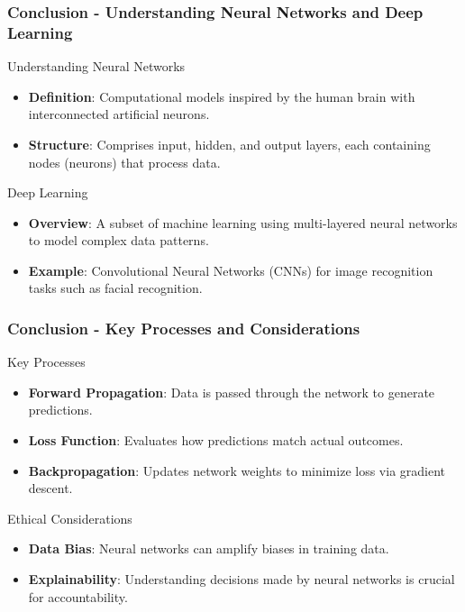 \documentclass[aspectratio=169]{beamer}
\begin{document}
\begin{frame}[fragile]
    \frametitle{Conclusion - Understanding Neural Networks and Deep Learning}
    
    \begin{block}{Understanding Neural Networks}
        \begin{itemize}
            \item \textbf{Definition}: Computational models inspired by the human brain with interconnected artificial neurons.
            \item \textbf{Structure}: Comprises input, hidden, and output layers, each containing nodes (neurons) that process data.
        \end{itemize}
    \end{block}
    
    \begin{block}{Deep Learning}
        \begin{itemize}
            \item \textbf{Overview}: A subset of machine learning using multi-layered neural networks to model complex data patterns.
            \item \textbf{Example}: Convolutional Neural Networks (CNNs) for image recognition tasks such as facial recognition.
        \end{itemize}
    \end{block}
\end{frame}

\begin{frame}[fragile]
    \frametitle{Conclusion - Key Processes and Considerations}
    
    \begin{block}{Key Processes}
        \begin{itemize}
            \item \textbf{Forward Propagation}: Data is passed through the network to generate predictions.
            \item \textbf{Loss Function}: Evaluates how predictions match actual outcomes.
            \item \textbf{Backpropagation}: Updates network weights to minimize loss via gradient descent.
        \end{itemize}
    \end{block}
    
    \begin{block}{Ethical Considerations}
        \begin{itemize}
            \item \textbf{Data Bias}: Neural networks can amplify biases in training data.
            \item \textbf{Explainability}: Understanding decisions made by neural networks is crucial for accountability.
        \end{itemize}
    \end{block}
\end{frame}
\end{document}
